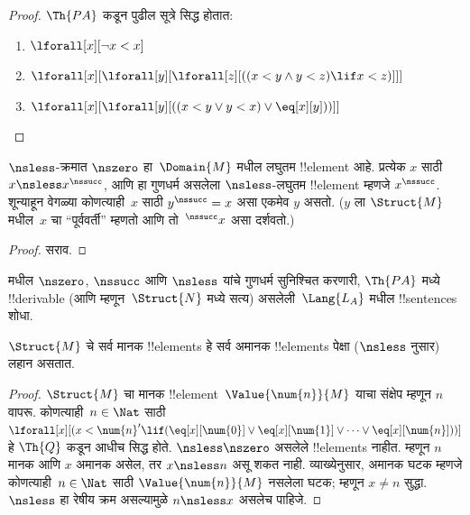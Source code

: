 \documentclass[../../../include/open-logic-section]{subfiles}
\begin{document}
\begin{proof}
$\Th{PA}$ कडून पुढील सूत्रे सिद्ध होतात:
\begin{enumerate}
\item $\lforall[x][\lnot x < x]$
\item $\lforall[x][\lforall[y][\lforall[z][((x < y \land y < z) \lif x < z)]]]$
\item $\lforall[x][\lforall[y][((x < y \lor y < x) \lor \eq[x][y]))]]$
\end{enumerate}
\end{proof}

\begin{prop}
 $\nsless$-क्रमात $\nszero$ हा~$\Domain{M}$ मधील
लघुतम !!{element} आहे. प्रत्येक $x$ साठी $x \nsless x^\nssucc$, आणि हा
गुणधर्म असलेला $\nsless$-लघुतम !!{element} म्हणजे $x^\nssucc$. शून्याहून
वेगळ्या कोणत्याही~$x$ साठी $y^\nssucc = x$ असा एकमेव $y$ असतो. ($y$ ला
$\Struct{M}$ मधील~$x$ चा ``पूर्ववर्ती'' म्हणतो आणि तो~$^\nssucc x$ असा
दर्शवतो.)
\end{prop}

\begin{proof}
सराव.
\end{proof}

\begin{prob}
 मधील $\nszero$, $\nssucc$ आणि
$\nsless$ यांचे गुणधर्म सुनिश्चित करणारी, $\Th{PA}$ मध्ये !!{derivable}
(आणि म्हणून~$\Struct{N}$ मध्ये सत्य) असलेली~$\Lang{L_A}$ मधील
!!{sentence}s शोधा.
\end{prob}

\begin{prop}
$\Struct{M}$ चे सर्व मानक !!{element}s हे सर्व अमानक !!{element}s पेक्षा
($\nsless$ नुसार) लहान असतात.
\end{prop}

\begin{proof}
$\Struct{M}$ चा मानक !!{element}~$\Value{\num{n}}{M}$ याचा संक्षेप म्हणून
$n$ वापरू. कोणत्याही~$n \in \Nat$ साठी
$\lforall[x][(x < \num{n}' \lif (\eq[x][\num{0}] \lor
  \eq[x][\num{1}] \lor \dots \lor \eq[x][\num{n}]))]$ हे $\Th{Q}$
कडून आधीच सिद्ध होते. $\nsless \nszero$ असलेले !!{element}s
नाहीत. म्हणून $n$ मानक आणि $x$ अमानक असेल, तर $x \nsless n$ असू शकत
नाही. व्याख्येनुसार, अमानक घटक म्हणजे कोणत्याही~$n \in \Nat$ साठी
$\Value{\num{n}}{M}$ नसलेला घटक; म्हणून $x \neq n$ सुद्धा. $\nsless$
हा रेषीय क्रम असल्यामुळे $n \nsless x$ असलेच पाहिजे.
\end{proof}
\end{document}
